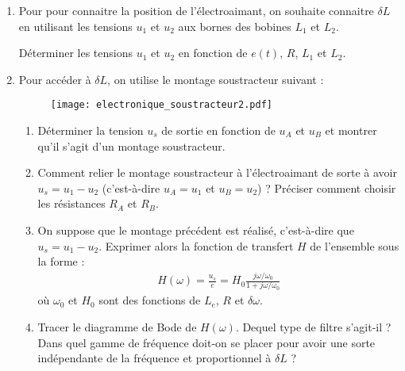 \begin{enumerate}

\item Pour pour connaitre la position de l'électroaimant, on souhaite connaitre $\delta L$ en utilisant les tensions $u_1$ et $u_2$ aux bornes des bobines $L_1$ et $L_2$. 

Déterminer les tensions $u_1$ et $u_2$ en fonction de $e(t)$, $R$, $L_1$ et $L_2$.

\item Pour accéder à $\delta L$, on utilise le montage soustracteur suivant :

\begin{figure}[!h]
\centering
\texttt{[image: electronique\_soustracteur2.pdf]}
\end{figure}

\begin{enumerate}

 \item Déterminer la tension $u_s$ de sortie en fonction de $u_A$ et $u_B$ et montrer qu'il s'agit d'un montage soustracteur.
 
 \item Comment relier le montage soustracteur à l'électroaimant de sorte à avoir $u_s=u_1-u_2$ (c'est-à-dire $u_A=u_1$ et $u_B=u_2$) ? Préciser comment choisir les résistances $R_A$ et $R_B$.
 
 \item On suppose que le montage précédent est réalisé, c'est-à-dire que $u_s=u_1-u_2$. Exprimer alors la fonction de transfert $H$ de l'ensemble sous la forme :
 \begin{align*}
 H(\omega)=\frac{u_s}{e}=H_0\frac{j\omega/\omega_0}{1+j\omega/\omega_0}
\end{align*}  
où $\omega_0$ et $H_0$ sont des fonctions de $L_e$, $R$ et $\delta \omega$.	

\item Tracer le diagramme de Bode de $H(\omega)$. Dequel type de filtre s'agit-il ? Dans quel gamme de fréquence doit-on se placer pour avoir une sorte indépendante de la fréquence et proportionnel à $\delta L$ ?

\end{enumerate}

\end{enumerate}

\newpage

